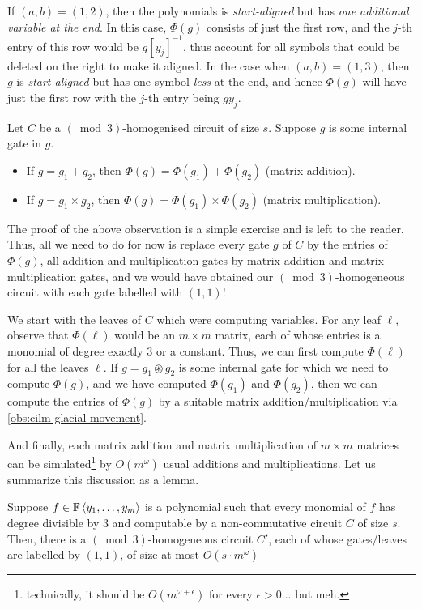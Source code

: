 If $(a,b) = (1,2)$, then the polynomials is \emph{start-aligned} but has \emph{one additional variable at the end}. In this case, $\Phi(g)$ consists of just the first row, and the $j$-th entry of this row would be $g [y_j]^{-1}$, thus account for all symbols that could be deleted on the right to make it aligned. In the case when $(a,b) = (1,3)$, then $g$ is \emph{start-aligned} but has one symbol \emph{less} at the end, and hence $\Phi(g)$ will have just the first row with the $j$-th entry being $g y_j$. 

\begin{observation}\label{obs:cilm-glacial-movement}
  Let $C$ be a $(\bmod{3})$-homogenised circuit of size $s$. Suppose $g$ is some internal gate in $g$.
  \begin{itemize}
  \item If $g = g_1 + g_2$, then $\Phi(g) = \Phi(g_1) + \Phi(g_2)$ (matrix addition).
  \item If $g = g_1 \times g_2$, then $\Phi(g) = \Phi(g_1) \times \Phi(g_2)$ (matrix multiplication). 
  \end{itemize}
\end{observation}

The proof of the above observation is a simple exercise and is left to the reader. Thus, all we need to do for now is replace every gate $g$ of $C$ by the entries of $\Phi(g)$, all addition and multiplication gates by matrix addition and matrix multiplication gates, and we would have obtained our $(\bmod{3})$-homogeneous circuit with each gate labelled with $(1,1)$!

We start with the leaves of $C$ which were computing variables. For any leaf $\ell$, observe that $\Phi(\ell)$ would be an $m\times m$ matrix, each of whose entries is a monomial of degree exactly $3$ or a constant. Thus, we can first  compute $\Phi(\ell)$ for all the leaves $\ell$. If $g = g_1 \circledast g_2$ is some internal gate for which we need to compute $\Phi(g)$, and we have computed $\Phi(g_1)$ and $\Phi(g_2)$, then we can compute the entries of $\Phi(g)$ by a suitable matrix addition/multiplication via \autoref{obs:cilm-glacial-movement}.

And finally, each matrix addition and matrix multiplication of $m\times m$ matrices can be simulated\footnote{technically, it should be $O(m^{\omega + \epsilon})$ for every $\epsilon > 0$... but meh.} by $O(m^\omega)$ usual additions and multiplications. Let us summarize this discussion as a lemma. 

\begin{lemmawp}
  Suppose $f \in \mathbb{F}\left\langle y_1,\ldots, y_m\right\rangle$ is a polynomial such that every monomial of $f$ has degree divisible by $3$ and computable by a non-commutative circuit $C$ of size $s$. Then, there is a $(\bmod{3})$-homogeneous circuit $C'$, each of whose gates/leaves are labelled by $(1,1)$, of size at most $O(s \cdot m^{\omega})$
\end{lemmawp}

